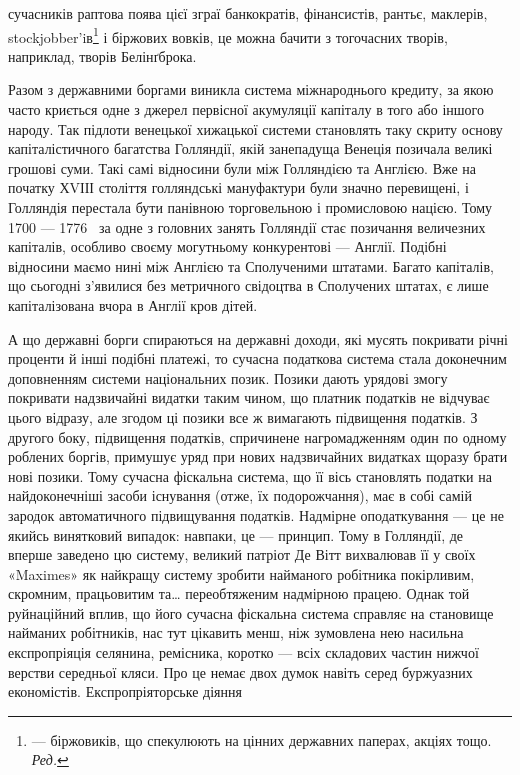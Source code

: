 \parcont{}  %
сучасників раптова поява цієї зграї банкократів, фінансистів, рантьє, маклерів,
stockjobber’iв\footnote*{
— біржовиків, що спекулюють на цінних державних паперах, акціях тощо. \emph{Ред.}
} і
біржових вовків, це можна бачити з тогочасних творів, наприклад, творів Белінґброка.

Разом з державними боргами виникла система міжнароднього кредиту, за якою часто криється одне з
джерел первісної акумуляції капіталу в того або іншого народу. Так підлоти венецької хижацької
системи становлять таку скриту основу капіталістичного
багатства Голляндії, якій занепадуща Венеція позичала великі грошові суми. Такі самі відносини були
між Голляндією та Англією. Вже на початку ХVІІІ століття голляндські мануфактури були значно
перевищені, і Голляндія перестала бути панівною торговельною і промисловою нацією. Тому 1700 — 1776~ за одне з головних занять Голляндії стає позичання величезних капіталів, особливо своєму
могутньому конкурентові — Англії. Подібні відносини маємо нині між Англією та Сполученими
штатами. Багато капіталів, що сьогодні з’явилися без метричного свідоцтва в Сполучених штатах, є
лише капіталізована вчора в Англії кров дітей.

А що державні борги спираються на державні доходи, які мусять покривати річні проценти й інші
подібні платежі, то сучасна податкова система стала доконечним доповненням системи національних
позик. Позики дають урядові змогу покривати
надзвичайні видатки таким чином, що платник податків не відчуває цього відразу, але згодом ці позики
все ж вимагають підвищення податків. З другого боку, підвищення податків, спричинене нагромадженням
один по одному роблених боргів, примушує
уряд при нових надзвичайних видатках щоразу брати нові позики. Тому сучасна фіскальна система, що її
вісь становлять податки на найдоконечніші засоби існування (отже, їх подорожчання), має в собі самій
зародок автоматичного підвищування податків. Надмірне оподаткування — це не якийсь винятковий
випадок: навпаки, це — принцип. Тому в Голляндії, де вперше заведено цю систему, великий патріот Де
Вітт вихвалював її у своїх «Maximes» як найкращу систему зробити найманого робітника покірливим,
скромним, працьовитим та\dots{} переобтяженим надмірною працею. Однак той руйнаційний вплив, що його
сучасна фіскальна система справляє на становище найманих робітників, нас тут цікавить менш, ніж
зумовлена нею насильна експропріяція селянина, ремісника, коротко — всіх складових частин нижчої
верстви середньої кляси. Про це немає двох думок навіть серед буржуазних економістів.
Експропріяторське діяння
\parbreak{}  %
